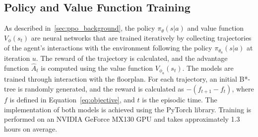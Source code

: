 \subsection{Policy and Value Function Training}
As described in~\ref{sec:ppo_background}, the policy $\pi_\theta(s|a)$ and value function $V_\phi(s_t)$ are neural networks that are trained iteratively by collecting trajectories of the agent's interactions with the environment following the policy $\pi_{\theta_u}(s|a)$ at iteration $u$. The reward of the trajectory is calculated, and the advantage function $\hat{A}_t$ is computed using the value function $V_{\phi_u}(s_t)$. The models are trained through interaction with the floorplan. For each trajectory, an initial B*-tree is randomly generated, and the reward is calculated as $-\left(f_{t+1} - f_t \right)$, where $f$ is defined in Equation~\eqref{eq:objective}, and $t$ is the episodic time. The implementation of both models is achieved using the PyTorch library. Training is performed on an NVIDIA GeForce MX130 GPU and takes approximately 1.3 hours on average. %